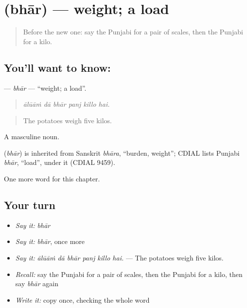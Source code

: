 \section[\texorpdfstring{\pa{ਭਾਰ} (bhār)}{ਭਾਰ (bhār)}]{ (bhār) — weight; a load}

\label{lesson:PA-C273-bhar}



\begin{quote}
Before the new one: say the Punjabi for a pair of scales, then the Punjabi for a kilo.
\end{quote}

\subsection*{You'll want to know: }
\textbf{} — \emph{bhār} — \textquotedblleft{}weight; a load\textquotedblright{}.

\begin{quote}
     
\end{quote}

\begin{quote}
\emph{ālūāṁ dā bhār panj killo hai.}
\end{quote}

\begin{quote}
The potatoes weigh five kilos.
\end{quote}

A masculine noun.

\begin{cousinweb}
\textbf{} (\emph{bhār}) is inherited from Sanskrit \emph{bhāra}, \textquotedblleft{}burden, weight\textquotedblright{}; CDIAL lists Punjabi \emph{bhār}, \textquotedblleft{}load\textquotedblright{}, under it (CDIAL 9459).
\end{cousinweb}

\begin{grammarlens}[title={What you've built}]
One more word for this chapter.
\end{grammarlens}

\subsection*{Your turn}
\begin{itemize}
\raggedright
  \item \emph{Say it:} \emph{bhār}
  \item \emph{Say it:} \emph{bhār}, once more
  \item \emph{Say it:} \emph{ālūāṁ dā bhār panj killo hai.} — The potatoes weigh five kilos.
  \item \emph{Recall:} say the Punjabi for a pair of scales, then the Punjabi for a kilo, then say \emph{bhār} again
  \item \emph{Write it:} copy \textbf{} once, checking the whole word
\end{itemize}

